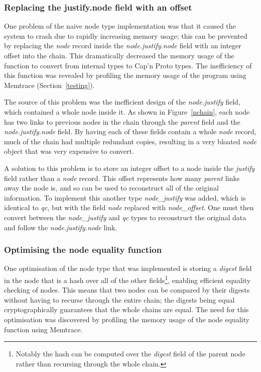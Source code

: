 \subsubsection{Replacing the justify.node field with an offset}
One problem of the naive node type implementation was that it caused the system to crash due to rapidly increasing memory usage; this can be prevented by replacing the \textit{node} record inside the \textit{node.justify.node} field with an integer offset into the chain. This dramatically decreased the memory usage of the function to convert from internal types to Cap'n Proto types. The inefficiency of this function was revealed by profiling the memory usage of the program using Memtrace  (Section~\ref{testing}).

The source of this problem was the inefficient design of the \textit{node.justify} field, which contained a whole node inside it. As shown in Figure~\ref{nchain}, each node has two links to previous nodes in the chain through the \textit{parent} field and the \textit{node.justify.node} field. By having each of these fields contain a whole \textit{node} record, much of the chain had multiple redundant copies, resulting in a very bloated \textit{node} object that was very expensive to convert.

A solution to this problem is to store an integer offset to a node inside the \textit{justify} field rather than a \textit{node} record. This offset represents how many \textit{parent} links away the node is, and so can be used to reconstruct all of the original information. To implement this another type \textit{node\_justify} was added, which is identical to \textit{qc}, but with the field \textit{node} replaced with \textit{node\_offset}. One must then convert between the \textit{node\_justify} and \textit{qc} types to reconstruct the original data and follow the \textit{node.justify.node} link.

\subsubsection{Optimising the node equality function} \label{equality}
One optimisation of the node type that was implemented is storing a \textit{digest} field in the node that is a hash over all of the other fields\footnote{Notably the hash can be computed over the \textit{digest} field of the parent node rather than recursing through the whole chain.}, enabling efficient equality checking of nodes. This means that two nodes can be compared by their digests without having to recurse through the entire chain; the digests being equal cryptographically guarantees that the whole chains are equal. The need for this optimisation was discovered by profiling the memory usage of the node equality function using Memtrace.

